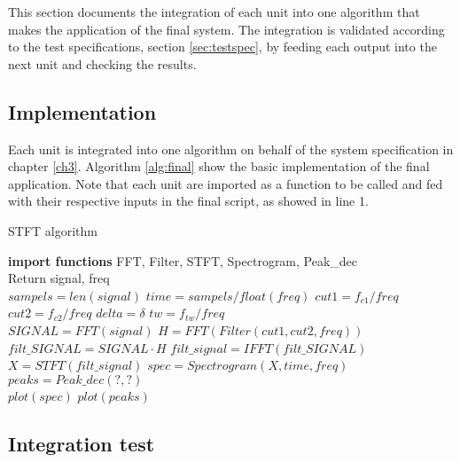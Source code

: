 This section documents the integration of each unit into one algorithm that makes the application of the final system. The integration is validated according to the test specifications, section \ref{sec:testspec}, by feeding each output into the next unit and checking the results. 

\subsection{Implementation}
Each unit is integrated into one algorithm on behalf of the system specification in chapter \ref{ch3}. Algorithm \ref{alg:final} show the basic implementation of the final application. Note that each unit are imported as a function to be called and fed with their respective inputs in the final script, as showed in line 1.
\begin{algorithm}[H]
\caption{STFT algorithm}
\label{STFTalg}
\begin{algorithmic}[1]
\State \textbf{import functions} FFT, Filter, STFT, Spectrogram, Peak\_dec  
\\
\State Return signal, freq 
\EndProcedure 
\\
\State $sampels = len(signal)$ 
\State $time   = sampels/float(freq)$
\State $cut1 = f_{c1}/freq$ 
\State $cut2 = f_{c2}/freq$
\State $delta = \delta$
\State $tw = f_{tw}/freq$
\\
\State $SIGNAL = FFT(signal) $
\State $H = FFT(Filter(cut1,cut2,freq))$
\State $filt\_SIGNAL = SIGNAL \cdot H$
\State $filt\_signal = IFFT(filt\_SIGNAL)$  
\EndProcedure 
\\
\State $X = STFT(filt\_signal)$
\State $spec = Spectrogram(X,time,freq)$
\State $peaks = Peak\_dec(?,?)$
\EndProcedure
\\
\State $plot(spec)$ 
\State $plot(peaks)$
\EndProcedure
\end{algorithmic}
\label{alg:final}
\end{algorithm}      

\subsection{Integration test}
